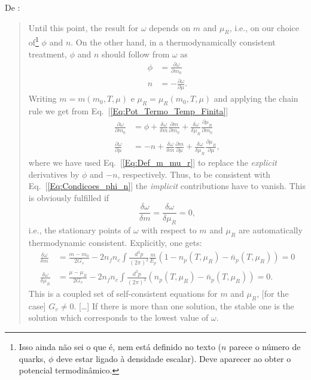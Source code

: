 De \textcite{Buballa}:
\begin{quote}
	Until this point, the result for $\omega$ depends on $m$ and $\mu_R$, i.e., on our choice of\footnote{Isso ainda não sei o que é, nem está definido no texto ($n$ parece o número de quarks, $\phi$ deve estar ligado à densidade escalar). Deve aparecer ao obter o potencial termodinâmico.} $\phi$ and $n$. On the other hand, in a thermodynamically consistent treatment, $\phi$ and $n$ should follow from $\omega$ as
	\begin{align}\label{Eq:Condicoes_phi_n}
		\phi &= \frac{\partial \omega}{\partial m_0} \\
		n &= -\frac{\partial \omega}{\partial \mu}.
	\end{align}
	Writing $m = m(m_0, T, \mu)$ e $\mu_R = \mu_R(m_0, T, \mu)$ and applying the chain rule we get from Eq.~[\eqref{Eq:Pot_Termo_Temp_Finita}]
	\begin{align}
		\frac{\partial \omega}{\partial m_0} &= \phi + \frac{\delta\omega}{\delta m}\frac{\partial m}{\partial m_0} + \frac{\delta \omega}{\delta\mu_R}\frac{\partial\mu_R}{\partial m_0} \\
		\frac{\partial\omega}{\partial \mu} &= -n + \frac{\delta \omega}{\delta m}\frac{\partial m}{\partial \mu} + \frac{\delta\omega}{\delta\mu_R}\frac{\partial\mu_R}{\partial\mu},
	\end{align}
	where we have used Eq.~[\eqref{Eq:Def_m_mu_r}] to replace the \emph{explicit} derivatives by $\phi$ and $-n$, respectively. Thus, to be consistent with Eq.~[\eqref{Eq:Condicoes_phi_n}] the \emph{implicit} contributions have to vanish. This is obviously fulfilled if
	\begin{equation}
		\frac{\delta\omega}{\delta m} = \frac{\delta \omega}{\delta\mu_R} = 0,
	\end{equation}
	i.e., the stationary points of $\omega$ with respect to $m$ and $\mu_R$ are automatically thermodynamic consistent. Explicitly, one gets:
	\begin{align}
		\frac{\delta\omega}{\delta m} &= \frac{m-m_0}{2G_s} - 2 n_f n_c \int \frac{d^3p}{(2\pi)^3} \frac{m}{E_p} (1 - n_p(T, \mu_R) - \bar{n}_p(T, \mu_R)) = 0 \\
		\frac{\delta\omega}{\delta \mu_R} &= \frac{\mu - \mu_R}{2G_v} - 2 n_f n_c \int \frac{d^3p}{(2\pi)^3} (n_p(T, \mu_R) - \bar{n}_p(T, \mu_R)) = 0.
	\end{align}
	This is a coupled set of self-consistent equations for $m$ and $\mu_R$, [for the case] $G_v \neq 0$. [\dots] If there is more than one solution, the stable one is the solution which corresponds to the lowest value of $\omega$.
\end{quote}

